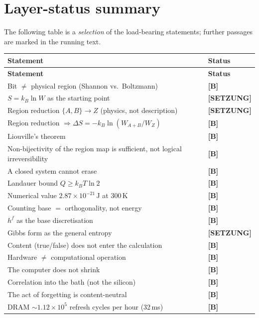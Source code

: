 \section{Layer-status summary}

The following table is a \emph{selection} of the load-bearing statements; further
passages are marked in the running text.

\begin{center}
\small
\begin{longtable}{@{}p{}l@{}}
\toprule
\textbf{Statement} & \textbf{Status} \\
\midrule
\endfirsthead
\toprule
\textbf{Statement} & \textbf{Status} \\
\midrule
\endhead
Bit $\ne$ physical region (Shannon vs.\ Boltzmann) & \textbf{[B]} \\
$S = k_B \ln W$ as the starting point & \textbf{[SETZUNG]} \\
Region reduction $\{A,B\}\to Z$ (physics, not description) & \textbf{[SETZUNG]} \\
Region reduction $\Rightarrow \Delta S = -k_B \ln(W_{A+B}/W_Z)$ & \textbf{[B]} \\
Liouville's theorem & \textbf{[B]} \\
Non-bijectivity of the region map is sufficient, not logical irreversibility & \textbf{[B]} \\
A closed system cannot erase & \textbf{[B]} \\
Landauer bound $Q \ge k_B T \ln 2$ & \textbf{[B]} \\
Numerical value $2.87\times10^{-21}$\,J at 300\,K & \textbf{[B]} \\
Counting base $=$ orthogonality, not energy & \textbf{[B]} \\
$h^f$ as the base discretisation & \textbf{[B]} \\
Gibbs form as the general entropy & \textbf{[SETZUNG]} \\
Content (true/false) does not enter the calculation & \textbf{[B]} \\
Hardware $\ne$ computational operation & \textbf{[B]} \\
The computer does not shrink & \textbf{[B]} \\
Correlation into the bath (not the silicon) & \textbf{[B]} \\
The act of forgetting is content-neutral & \textbf{[B]} \\
DRAM ${\sim}1.12\times10^{5}$ refresh cycles per hour (32\,ms) & \textbf{[B]} \\

\end{longtable}
\end{center}
